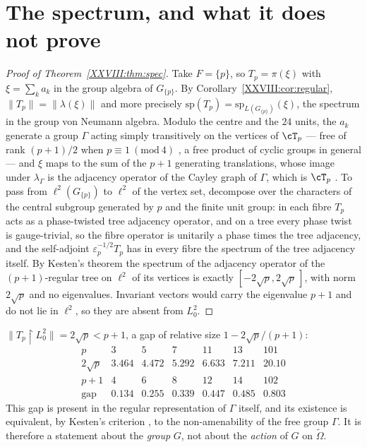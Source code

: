 \section{The spectrum, and what it does not prove}\label{XXVIII:sec:spec}

\begin{proof}[Proof of Theorem~\ref{XXVIII:thm:spec}]
Take $F=\{p\}$, so $T_p=\pi(\xi)$ with $\xi=\sum_ka_k$ in the group algebra of $G_{\{p\}}$. By
Corollary~\ref{XXVIII:cor:regular}, $\|T_p\|=\|\lambda(\xi)\|$ and more precisely
$\mathrm{sp}(T_p)=\mathrm{sp}_{L(G_{\{p\}})}(\xi)$, the spectrum in the group von Neumann algebra.
Modulo the centre and the $24$ units, the $a_k$ generate a group $\Gamma$
acting simply transitively on the vertices of $\cT_p$ --- free of rank $(p+1)/2$ when
$p\equiv1\ (\mathrm{mod}\ 4)$ \cite{LPS}, a free product of cyclic groups in general ---
and $\xi$ maps to the sum of the
$p+1$ generating translations, whose image under $\lambda_\Gamma$ is the adjacency operator of the
Cayley graph of $\Gamma$, which is $\cT_p$ \cite{Serre}. To pass from $\ell^2(G_{\{p\}})$ to
$\ell^2$ of the vertex set, decompose over the characters of the central subgroup generated
by $p$ and the finite unit group: in each fibre $T_p$ acts as a phase-twisted tree adjacency
operator, and on a tree every phase twist is gauge-trivial, so the fibre operator is
unitarily a phase times the tree adjacency, and the self-adjoint $\varepsilon_p^{-1/2}T_p$
has in every fibre the spectrum of the tree adjacency itself. By Kesten's theorem \cite{Kesten} the
spectrum of the adjacency
operator of the $(p+1)$-regular tree on $\ell^2$ of its vertices is exactly
$[-2\sqrt p,2\sqrt p\,]$, with norm $2\sqrt p$ and no eigenvalues. Invariant vectors would carry
the eigenvalue $p+1$ and do not lie in $\ell^2$, so they are absent from $L^2_0$.
\end{proof}

\begin{corollary}\label{XXVIII:cor:gap}
$\|T_p\restriction L^2_0\|=2\sqrt p<p+1$, a gap of relative size $1-2\sqrt p/(p+1)$:
\[
\begin{array}{lrrrrrr}
p & 3 & 5 & 7 & 11 & 13 & 101\\
2\sqrt p & 3.464 & 4.472 & 5.292 & 6.633 & 7.211 & 20.10\\
p+1 & 4 & 6 & 8 & 12 & 14 & 102\\
\text{gap} & 0.134 & 0.255 & 0.339 & 0.447 & 0.485 & 0.803
\end{array}
\]
This gap is present in the regular representation of $\Gamma$ itself, and its existence is
equivalent, by Kesten's criterion \cite{Kesten}, to the non-amenability of the free group
$\Gamma$. It is
therefore a statement about the \emph{group} $G$, not about the \emph{action} of $G$ on
$\widetilde\Omega$.
\end{corollary}

